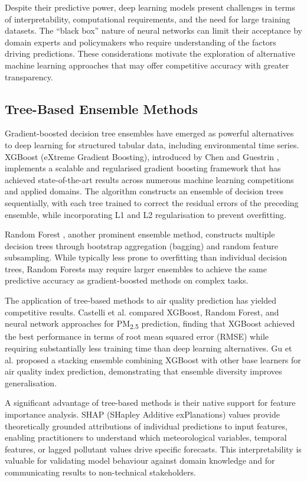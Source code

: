 Despite their predictive power, deep learning models present challenges in terms of interpretability, computational requirements, and the need for large training datasets. The ``black box'' nature of neural networks can limit their acceptance by domain experts and policymakers who require understanding of the factors driving predictions. These considerations motivate the exploration of alternative machine learning approaches that may offer competitive accuracy with greater transparency.

\subsection{Tree-Based Ensemble Methods}
\label{subsec:tree_methods}

Gradient-boosted decision tree ensembles have emerged as powerful alternatives to deep learning for structured tabular data, including environmental time series. XGBoost (eXtreme Gradient Boosting), introduced by Chen and Guestrin \cite{chen2016xgboost}, implements a scalable and regularised gradient boosting framework that has achieved state-of-the-art results across numerous machine learning competitions and applied domains. The algorithm constructs an ensemble of decision trees sequentially, with each tree trained to correct the residual errors of the preceding ensemble, while incorporating L1 and L2 regularisation to prevent overfitting.

Random Forest \cite{breiman2001random}, another prominent ensemble method, constructs multiple decision trees through bootstrap aggregation (bagging) and random feature subsampling. While typically less prone to overfitting than individual decision trees, Random Forests may require larger ensembles to achieve the same predictive accuracy as gradient-boosted methods on complex tasks.

The application of tree-based methods to air quality prediction has yielded competitive results. Castelli et al. \cite{castelli2020machine} compared XGBoost, Random Forest, and neural network approaches for PM\textsubscript{2.5} prediction, finding that XGBoost achieved the best performance in terms of root mean squared error (RMSE) while requiring substantially less training time than deep learning alternatives. Gu et al. \cite{gu2020stacking} proposed a stacking ensemble combining XGBoost with other base learners for air quality index prediction, demonstrating that ensemble diversity improves generalisation.

A significant advantage of tree-based methods is their native support for feature importance analysis. SHAP (SHapley Additive exPlanations) values \cite{lundberg2017unified} provide theoretically grounded attributions of individual predictions to input features, enabling practitioners to understand which meteorological variables, temporal features, or lagged pollutant values drive specific forecasts. This interpretability is valuable for validating model behaviour against domain knowledge and for communicating results to non-technical stakeholders.

